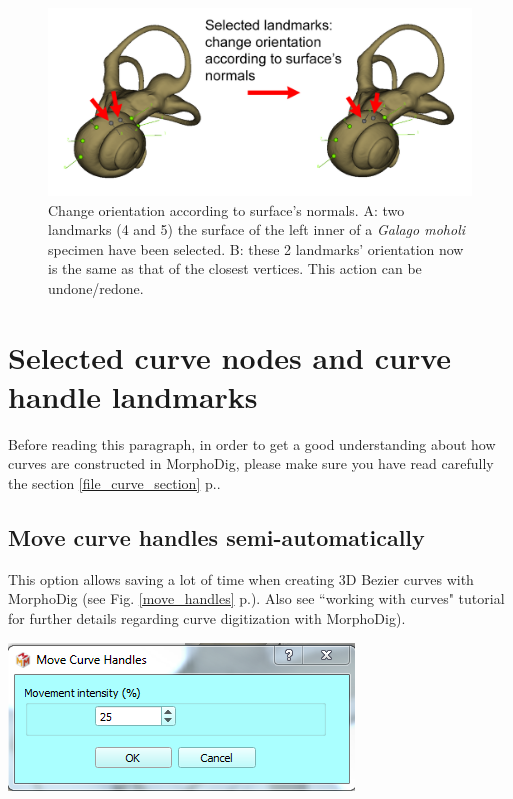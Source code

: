 \begin{figure}
  \centering
  \includegraphics[scale=0.3]{images/10/reorient.png} 
	\caption{Change orientation according to surface's normals. A: two landmarks (4 and 5) the surface of the left inner of a \textit{Galago moholi} specimen have been selected. B: these 2 landmarks' orientation now is the same as that of the closest vertices. This action can be undone/redone.}
\label{reorient}
 
\end{figure}


\section{Selected curve nodes and curve handle landmarks}\label{landmarks_curves_section}
Before reading this paragraph, in order to get a good understanding  about how curves are constructed in MorphoDig, please make sure you have read carefully the section \ref{file_curve_section} p.\pageref{file_curve_section}.
\subsection{Move curve handles semi-automatically}
\noindent
\begin{minipage}{0.5\textwidth}
This option allows saving a lot of time when creating
3D Bezier curves with MorphoDig (see Fig. \ref{move_handles} p.\pageref{move_handles}). Also see ``working
with curves" tutorial for further details regarding curve digitization with MorphoDig).
\end{minipage}    
\begin{minipage}{0.5\textwidth}\centering
  \includegraphics[scale=0.5]{images/10/move.png}
 \end{minipage} 
\noindent



